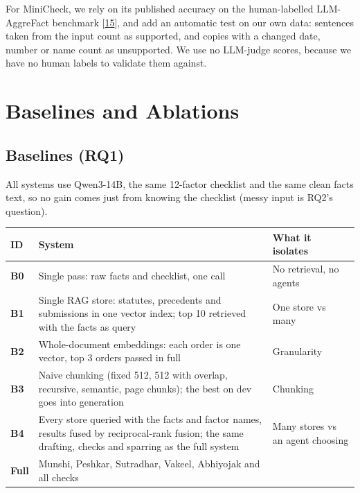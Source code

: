 \documentclass[10pt,a4paper]{article}
\begin{document}
For MiniCheck, we rely on its published accuracy on the human-labelled LLM-AggreFact benchmark [\href{https://aclanthology.org/2024.emnlp-main.499/}{15}], and add an automatic test on our own data: sentences taken from the input count as supported, and copies with a changed date, number or name count as unsupported. We use no LLM-judge scores, because we have no human labels to validate them against.

\section{Baselines and Ablations}

\subsection{Baselines (RQ1)}

All systems use Qwen3-14B, the same 12-factor checklist and the same clean facts text, so no gain comes just from knowing the checklist (messy input is RQ2's question).

{\small
\begin{xltabular}{\linewidth}{@{}>{\raggedright\arraybackslash{}\hsize}X>{\raggedright\arraybackslash{}\hsize}X>{\raggedright\arraybackslash{}\hsize}X@{}}
\toprule
\textbf{ID} & \textbf{System} & \textbf{What it isolates} \\
\midrule
\endhead
\textbf{B0} & Single pass: raw facts and checklist, one call & No retrieval, no agents \\
\textbf{B1} & Single RAG store: statutes, precedents and submissions in one vector index; top 10 retrieved with the facts as query & One store vs many \\
\textbf{B2} & Whole-document embeddings: each order is one vector, top 3 orders passed in full & Granularity \\
\textbf{B3} & Naive chunking (fixed 512, 512 with overlap, recursive, semantic, page chunks); the best on dev goes into generation & Chunking \\
\textbf{B4} & Every store queried with the facts and factor names, results fused by reciprocal-rank fusion; the same drafting, checks and sparring as the full system & Many stores vs an agent choosing \\
\textbf{Full} & Munshi, Peshkar, Sutradhar, Vakeel, Abhiyojak and all checks &  \\
\bottomrule
\end{xltabular}}
\end{document}
